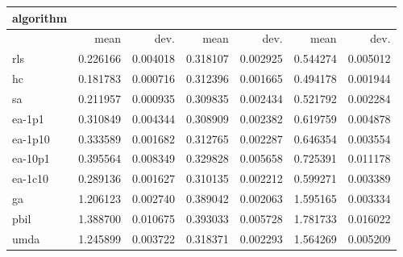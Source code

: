 \begin{tabular}{@{}l*{6}{>{{}}N{1}{2}}@{}}
\toprule
{algorithm} &  &  &  \\
\midrule
& {mean} & {dev.} & {mean} & {dev.} & {mean} & {dev.} \\
\midrule
rls & 0.226166 & 0.004018 & 0.318107 & 0.002925 & 0.544274 & 0.005012 \\
 hc & 0.181783 & 0.000716 & 0.312396 & 0.001665 & 0.494178 & 0.001944 \\
 sa & 0.211957 & 0.000935 & 0.309835 & 0.002434 & 0.521792 & 0.002284 \\
 ea-1p1 & 0.310849 & 0.004344 & 0.308909 & 0.002382 & 0.619759 & 0.004878 \\
 ea-1p10 & 0.333589 & 0.001682 & 0.312765 & 0.002287 & 0.646354 & 0.003554 \\
 ea-10p1 & 0.395564 & 0.008349 & 0.329828 & 0.005658 & 0.725391 & 0.011178 \\
 ea-1c10 & 0.289136 & 0.001627 & 0.310135 & 0.002212 & 0.599271 & 0.003389 \\
 ga & 1.206123 & 0.002740 & 0.389042 & 0.002063 & 1.595165 & 0.003334 \\
 pbil & 1.388700 & 0.010675 & 0.393033 & 0.005728 & 1.781733 & 0.016022 \\
 umda & 1.245899 & 0.003722 & 0.318371 & 0.002293 & 1.564269 & 0.005209 \\
 \bottomrule
\end{tabular}
